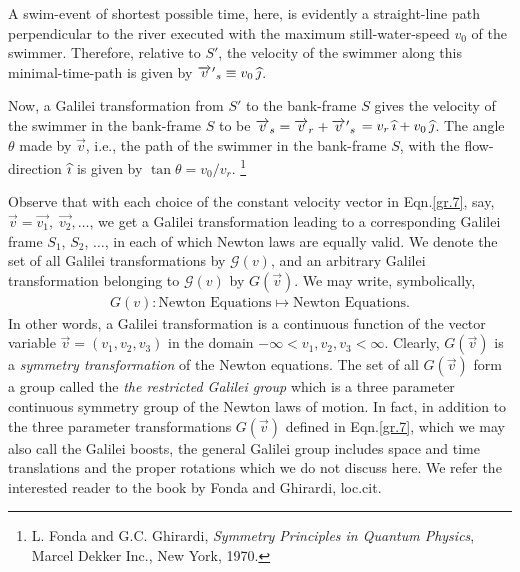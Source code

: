 A swim-event of shortest possible time, here,  is 
evidently a straight-line path perpendicular to the 
river executed with the maximum still-water-speed $v_0$ 
of the swimmer. Therefore, relative to $S'$, the 
velocity of the swimmer along this minimal-time-path is 
given by ${\overrightarrow{v}\hspace*{.3pt}'}_s\equiv v_0\,{\widehat{\jmath}}$. 

\enlargethispage*{1\bsk}
Now, a Galilei transformation from $S'$ to the 
bank-frame $S$ gives the velocity of the swimmer in the 
bank-frame $S$ to be $\overrightarrow{v}_s=\overrightarrow{v}_r+{\overrightarrow{v}\hspace*{.3pt}'}_s$ 
$=v_r\,{\widehat{\imath}}+v_0\,{\widehat{\jmath}}$. The angle $\theta$ made by 
$\vec{v}$, i.e., the path of the swimmer in the 
bank-frame $S$, with the flow-direction ${\widehat{\imath}}$ is given 
by $\tan\theta = v_0/v_r$. 
\ebx
{}\footnote{L. Fonda and G.C. Ghirardi, 
\textsl{Symmetry Principles in Quantum Physics}, Marcel 
Dekker Inc., New York, 1970.}  
 
\soln Observe that with each choice of the constant 
velocity vector in Eqn.\eqref{gr.7}, say, $\vec{v} = 
\vec{v_1}, \; \vec{ v_2}, \dots$, we get a Galilei 
transformation leading to a corresponding Galilei frame 
$S_1$, $S_2$, $\dots$, in each of which Newton laws are 
equally valid.  We denote the set of all Galilei 
transformations by $ {\mathcal{G}(v)} $, and an 
arbitrary Galilei transformation belonging to $ 
{\mathcal{G}(v)} $ by $ G(\vec{v}) $.  We may write, 
symbolically,
\begin{align}\label{9}
G(v): \text{Newton Equations} \mapsto \text{Newton
Equations}.
\end{align}
In other words, a Galilei transformation is a 
continuous function of the vector variable $\vec{v} 
=(v_1,v_2,v_3) $ in the domain $ -\infty< 
v_1,v_2,v_3<\infty $. Clearly, $G(\vec{v})$ is a 
\textsl{symmetry transformation} of the Newton 
equations. The set of all $G(\vec{v})$ form a group 
called the \textsl{the restricted Galilei group} which 
is a three parameter continuous symmetry group of the 
Newton laws of motion. In fact, in addition to the 
three parameter transformations $ G(\vec{v}) $ defined 
in Eqn.\eqref{gr.7}, which we may also call the 
{Galilei boosts}, the general Galilei group includes 
space and time translations and the proper rotations 
which we do not discuss here. We refer the interested 
reader to the book by Fonda and Ghirardi, loc.cit.

